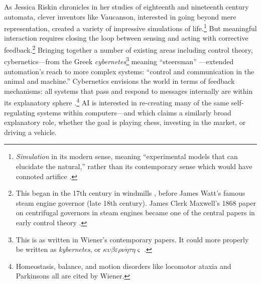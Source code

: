 

As Jessica Riskin chronicles in her studies of eighteenth and
nineteenth century automata, clever inventors like Vaucanson, interested in going
beyond mere representation, created a variety of impressive
simulations of life.\footnote{\emph{Simulation} in its modern sense, meaning
``experimental models that can elucidate the natural,'' rather than its
contemporary sense which would have connoted artifice \cite[p.
  605--606]{riskinDuck}.} But meaningful interaction requires closing the loop between
sensing and acting with corrective feedback.\footnote{This began in
  the 17th century in windmills \cite{richardhills}, before James
  Watt's famous steam engine governor
(late 18th century). James Clerk Maxwell's 1868 paper on centrifugal
 governors in steam engines became one of the central papers in early
 control theory \cite{ottomayr}.} Bringing together a number of existing
 areas including control theory,
 cybernetics---from the Greek \emph{cybernetes}\footnote{This is as
   written in Wiener's contemporary papers. It could more properly be written
   as \emph{kybernetes}, or 
   $\kappa\upsilon\beta\varepsilon\rho\nu\acute{\eta}\tau\eta\varsigma$
   \cite[p. 11]{cybernetics}.} meaning 
 ``steersman'' \cite[p. 6]{wienerMainIdeas}---extended automation's reach to more complex
 systems: ``control and communication in the animal and machine.''
 Cybernetics envisions the world in 
 terms of feedback mechanisms: all systems that pass and respond to
 messages internally are within its explanatory sphere \cite[p.
   10-15]{wienerMainIdeas}.\footnote{Homeostasis, balance, and motion
 disorders like locomotor ataxia and Parkinsons all are cited by Wiener.}
 AI is interested in re-creating many of the same
 self-regulating systems within computers---and which claims a
 similarly broad explanatory role, whether the goal is playing chess,
 investing in the market, or driving a vehicle. 

